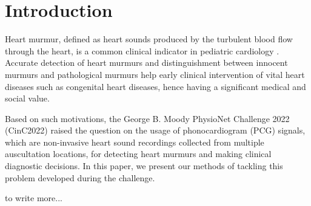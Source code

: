 \section{Introduction}
\label{sec:intro}

Heart murmur, defined as heart sounds produced by the turbulent blood flow through the heart, is a common clinical indicator in pediatric cardiology \cite{Masic_2018}. Accurate detection of heart murmurs and distinguishment between innocent murmurs and pathological murmurs help early clinical intervention of vital heart diseases such as congenital heart diseases, hence having a significant medical and social value.

Based on such motivations, the George B. Moody PhysioNet Challenge 2022 (CinC2022) \cite{Oliveira_2021_CirCor} raised the question on the usage of phonocardiogram (PCG) signals, which are non-invasive heart sound recordings collected from multiple auscultation locations, for detecting heart murmurs and making clinical diagnostic decisions. In this paper, we present our methods of tackling this problem developed during the challenge.

to write more...
